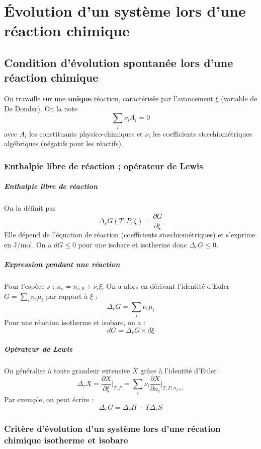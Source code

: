 \documentclass[french]{book}
\theoremstyle{plain}
\theoremstyle{definition}
\theoremstyle{remark}
\begin{document}
\chapter{Évolution d'un système lors d'une réaction chimique}
\localtableofcontents
\section{Condition d'évolution spontanée lors d'une réaction chimique}
On travaille sur une \textbf{unique} réaction, caractérisée par l’avancement $\xi$ (variable de De Donder). On la note $$\sum_i \nu_iA_i=0$$ avec $A_i$ les constituants physico-chimiques et $\nu_i$ les coefficients stœchiométriques algébriques (négatifs pour les réactifs).
\subsection{Enthalpie libre de réaction ; opérateur de Lewis}
\paragraph{Enthalpie libre de réaction} On la définit par $$\Delta_rG(T,P,\xi)=\frac{\partial G}{\partial\xi}$$ Elle dépend de l’équation de réaction (coefficients stœchiométriques) et s'exprime en J/mol. On a $dG\leqslant0$ pour une isobare et isotherme donc $\Delta_rG\leqslant0$.
\paragraph{Expression pendant une réaction}  Pour l’espèce $s$ : $n_s=n_{s,0}+\nu_i\xi$. On a alors en dérivant l'identité d'Euler $\displaystyle G=\sum_i n_i\mu_i$ par rapport à $\xi$ : $$\Delta_rG=\sum_i\nu_i\mu_i$$ Pour une réaction isotherme et isobare, on a : $$dG=\Delta_rG\times d\xi$$ 
\paragraph{Opérateur de Lewis}
On généralise à toute grandeur extensive $X$ grâce à l'identité d'Euler : $$\Delta_rX=\frac{\partial X}{\partial\xi}\bigg|_{T,P}=\sum_i\nu_i\frac{\partial X}{\partial n_i}\bigg|_{T,P,n_{j\ne i}}$$ Par exemple, on peut écrire : $$\Delta_rG=\Delta_rH-T\Delta_rS$$
\subsection{Critère d'évolution d'un système lors d'une récation chimique isotherme et isobare}
\end{document}
